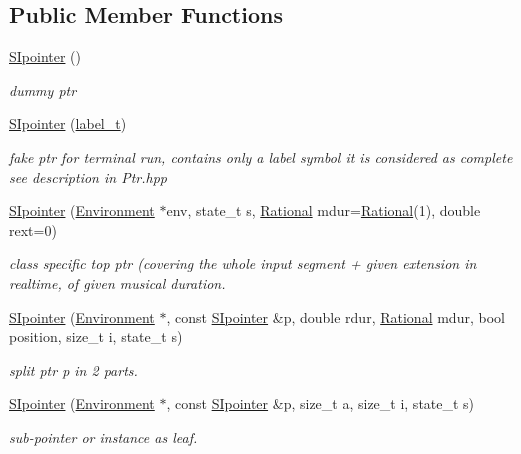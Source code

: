 \subsection*{Public Member Functions}
\begin{DoxyCompactItemize}
\item 
\mbox{\hyperlink{group__table_ga7e962d8567566398e5f620ef964267cd}{S\+Ipointer}} ()
\begin{DoxyCompactList}\small\item\em dummy ptr \end{DoxyCompactList}\item 
\mbox{\hyperlink{group__table_ga464163b749ecd94516ab6e94f7baa5bf}{S\+Ipointer}} (\mbox{\hyperlink{group__output_ga22fde970e635fcf63962743b2d5c441d}{label\+\_\+t}})
\begin{DoxyCompactList}\small\item\em fake ptr for terminal run, contains only a label symbol it is considered as complete see description in Ptr.\+hpp \end{DoxyCompactList}\item 
\mbox{\hyperlink{group__table_gac560506e7bf1439877178cf6d2459e7f}{S\+Ipointer}} (\mbox{\hyperlink{classEnvironment}{Environment}} $\ast$env, state\+\_\+t s, \mbox{\hyperlink{classRational}{Rational}} mdur=\mbox{\hyperlink{classRational}{Rational}}(1), double rext=0)
\begin{DoxyCompactList}\small\item\em class specific top ptr (covering the whole input segment + given extension in realtime, of given musical duration. \end{DoxyCompactList}\item 
\mbox{\hyperlink{group__table_ga3abe73f8e3188ca49f11e09d794f1f05}{S\+Ipointer}} (\mbox{\hyperlink{classEnvironment}{Environment}} $\ast$, const \mbox{\hyperlink{classSIpointer}{S\+Ipointer}} \&p, double rdur, \mbox{\hyperlink{classRational}{Rational}} mdur, bool position, size\+\_\+t i, state\+\_\+t s)
\begin{DoxyCompactList}\small\item\em split ptr p in 2 parts. \end{DoxyCompactList}\item 
\mbox{\hyperlink{group__table_gab5c8a8654ef626d4c7b75ef67ed28aa9}{S\+Ipointer}} (\mbox{\hyperlink{classEnvironment}{Environment}} $\ast$, const \mbox{\hyperlink{classSIpointer}{S\+Ipointer}} \&p, size\+\_\+t a, size\+\_\+t i, state\+\_\+t s)
\begin{DoxyCompactList}\small\item\em sub-\/pointer or instance as leaf. \end{DoxyCompactList}\item 

\end{DoxyCompactItemize}
